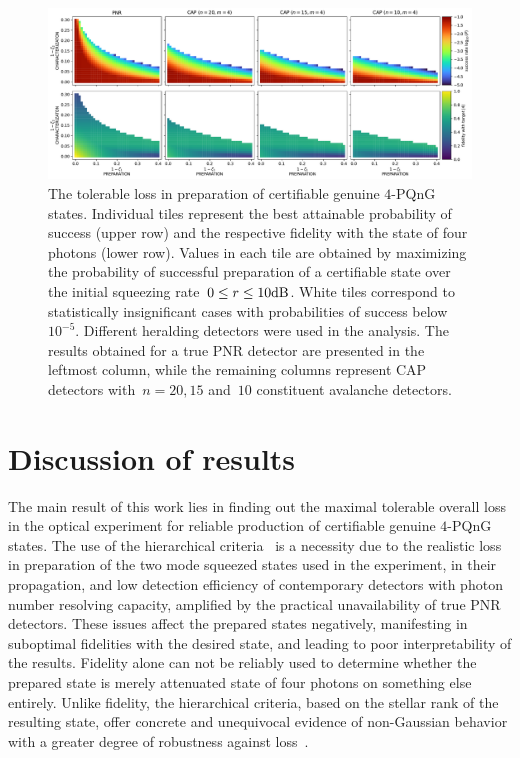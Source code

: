 \documentclass{article}
\begin{document}
%
%

\begin{figure}[h]
  \begin{center}
    \includegraphics[width = \columnwidth]{import/202411/paper_unified_04.pdf}
  \end{center}
  \caption{
    The tolerable loss in preparation of certifiable genuine $4$-PQnG states. Individual tiles represent the best attainable probability of success (upper row) and the respective fidelity with the state of four photons (lower row). Values in each tile are obtained by maximizing the probability of successful preparation of a certifiable state over the initial squeezing rate~${0 \leq r \leq 10\mathrm{dB}}$. White tiles correspond to statistically insignificant cases with probabilities of success below $10^{-5}$. Different heralding detectors were used in the analysis. The results obtained for a true PNR detector are presented in the leftmost column, while the remaining columns represent CAP detectors with~${n = 20, 15}$ and~$10$ constituent avalanche detectors.
  }
  \label{f-res-4}
\end{figure}

\section{Discussion of results}

The main result of this work lies in finding out the maximal tolerable overall loss in the optical experiment for reliable production of certifiable genuine $4$-PQnG states. The use of the hierarchical criteria~\cite{lachman2019} is a necessity due to the realistic loss in preparation of the two mode squeezed states used in the experiment, in their propagation, and low detection efficiency of contemporary detectors with photon number resolving capacity, amplified by the practical unavailability of true PNR detectors. These issues affect the prepared states negatively, manifesting in suboptimal fidelities with the desired state, and leading to poor interpretability of the results. Fidelity alone can not be reliably used to determine whether the prepared state is merely attenuated state of four photons on something else entirely. Unlike fidelity, the hierarchical criteria, based on the stellar rank of the resulting state, offer concrete and unequivocal evidence of non-Gaussian behavior with a greater degree of robustness against loss~\cite{lachman2019}.
\end{document}
